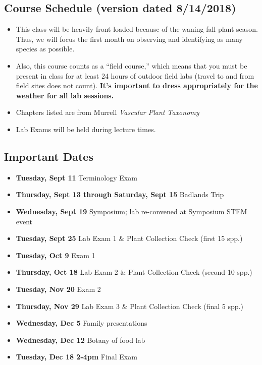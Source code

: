 \documentclass{tufte-handout}
\begin{document}
\begin{fullwidth}

\section{Course Schedule (version dated 8/14/2018)}

\begin{itemize}
	\item This class will be heavily front-loaded because of the waning fall plant season. Thus, we will focus the first month on observing and identifying as many species as possible.
	\item Also, this course counts as a ``field course,'' which means that you must be present in class for at least 24 hours of outdoor field labs (travel to and from field sites does not count). \textbf{It's important to dress appropriately for the weather for all lab sessions.}
	\item Chapters listed are from Murrell \emph{Vascular Plant Taxonomy}
	\item Lab Exams will be held during lecture times.
\end{itemize}

\subsection{Important Dates}

\begin{itemize}
	\item \textbf{Tuesday, Sept 11} Terminology Exam
	\item \textbf{Thursday, Sept 13 through Saturday, Sept 15} Badlands Trip
	\item \textbf{Wednesday, Sept 19} Symposium; lab re-convened at Symposium STEM event
	\item \textbf{Tuesday, Sept 25} Lab Exam 1 \& Plant Collection Check (first 15 spp.)
	\item \textbf{Tuesday, Oct 9} Exam 1
	\item \textbf{Thursday, Oct 18} Lab Exam 2 \& Plant Collection Check (second 10 spp.)
	\item \textbf{Tuesday, Nov 20} Exam 2
	\item \textbf{Thursday, Nov 29} Lab Exam 3 \& Plant Collection Check (final 5 spp.)
	\item \textbf{Wednesday, Dec 5} Family presentations
	\item \textbf{Wednesday, Dec 12} Botany of food lab
	\item \textbf{Tuesday, Dec 18 2-4pm} Final Exam
\end{itemize}


\end{fullwidth}
\end{document}
